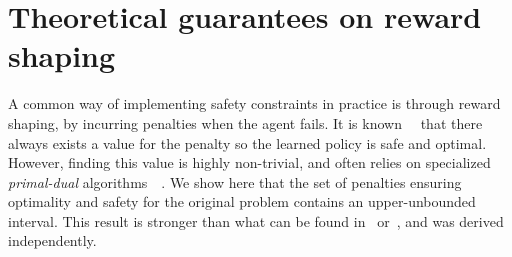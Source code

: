 \section{Theoretical guarantees on reward shaping} \label{sec:strong duality}
A common way of implementing safety constraints in practice is through reward shaping, by incurring penalties when the agent fails. It is known~\cite{altman1999constrained}~\cite{paternain2019safe} that there always exists a value for the penalty so the learned policy is safe and optimal. However, finding this value is highly non-trivial, and often relies on specialized\emph{ primal-dual} algorithms~\cite{chow2017risk}~\cite{paternain2019safe}. We show here that the set of penalties ensuring optimality and safety for the original problem contains an upper-unbounded interval. This result is stronger than what can be found in~\cite{altman1999constrained} or~\cite{paternain2019safe}, and was derived independently.


